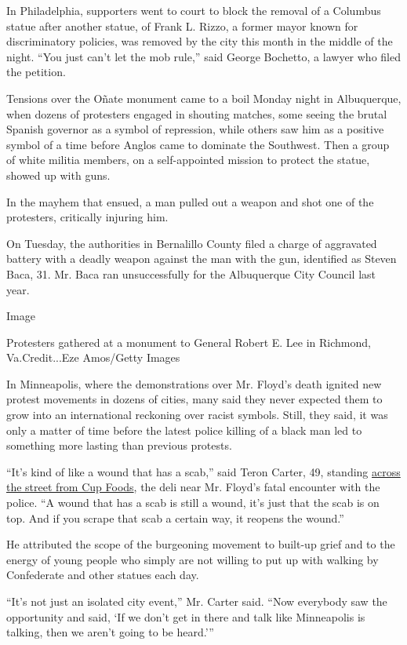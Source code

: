 In Philadelphia, supporters went to court to block the removal of a
Columbus statue after another statue, of Frank L. Rizzo, a former mayor
known for discriminatory policies, was removed by the city this month in
the middle of the night. ``You just can't let the mob rule,'' said
George Bochetto, a lawyer who filed the petition.

Tensions over the Oñate monument came to a boil Monday night in
Albuquerque, when dozens of protesters engaged in shouting matches, some
seeing the brutal Spanish governor as a symbol of repression, while
others saw him as a positive symbol of a time before Anglos came to
dominate the Southwest. Then a group of white militia members, on a
self-appointed mission to protect the statue, showed up with guns.

In the mayhem that ensued, a man pulled out a weapon and shot one of the
protesters, critically injuring him.

On Tuesday, the authorities in Bernalillo County filed a charge of
aggravated battery with a deadly weapon against the man with the gun,
identified as Steven Baca, 31. Mr. Baca ran unsuccessfully for the
Albuquerque City Council last year.

Image

Protesters gathered at a monument to General Robert E. Lee in Richmond,
Va.Credit...Eze Amos/Getty Images

In Minneapolis, where the demonstrations over Mr. Floyd's death ignited
new protest movements in dozens of cities, many said they never expected
them to grow into an international reckoning over racist symbols. Still,
they said, it was only a matter of time before the latest police killing
of a black man led to something more lasting than previous protests.

``It's kind of like a wound that has a scab,'' said Teron Carter, 49,
standing
\href{https://www.nytimes3xbfgragh.onion/2020/06/15/us/cup-foods-minneapolis-george-floyd.html}{across
the street from Cup Foods}, the deli near Mr. Floyd's fatal encounter
with the police. ``A wound that has a scab is still a wound, it's just
that the scab is on top. And if you scrape that scab a certain way, it
reopens the wound.''

He attributed the scope of the burgeoning movement to built-up grief and
to the energy of young people who simply are not willing to put up with
walking by Confederate and other statues each day.

``It's not just an isolated city event,'' Mr. Carter said. ``Now
everybody saw the opportunity and said, `If we don't get in there and
talk like Minneapolis is talking, then we aren't going to be heard.'''

